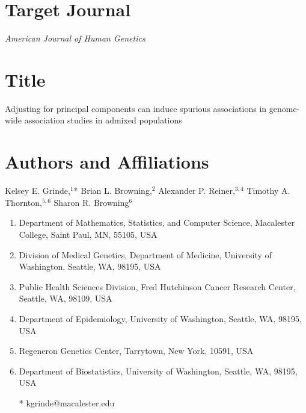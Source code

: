 \documentclass[12pt]{article}
\newcommand{\edit}[1]{{\color{red}{#1}}}
\begin{document}
\section*{Target Journal}

\textit{American Journal of Human Genetics}




\section*{Title}


Adjusting for principal components can induce spurious
 associations in genome-wide association studies
 in admixed populations

\section*{Authors and Affiliations}

Kelsey E. Grinde,$^{1}$* 
Brian L. Browning,$^{2}$ 
Alexander P. Reiner,$^{3,4}$
Timothy A. Thornton,$^{5,6}$ %
Sharon R. Browning$^{6}$

\begin{enumerate}
\item Department of Mathematics, Statistics, and Computer Science, Macalester College, Saint Paul, MN, 55105, USA 
\item Division of Medical Genetics, Department of Medicine, University of Washington, Seattle, WA, 98195, USA 
\item Public Health Sciences Division, Fred Hutchinson Cancer Research Center, Seattle, WA, 98109, USA
\item Department of Epidemiology, University of Washington, Seattle, WA, 98195, USA
\item Regeneron Genetics Center, Tarrytown, New York, 10591, USA
\item Department of Biostatistics, University of Washington, Seattle, WA, 98195, USA
\item[*] kgrinde@macalester.edu
\end{enumerate}
\end{document}
